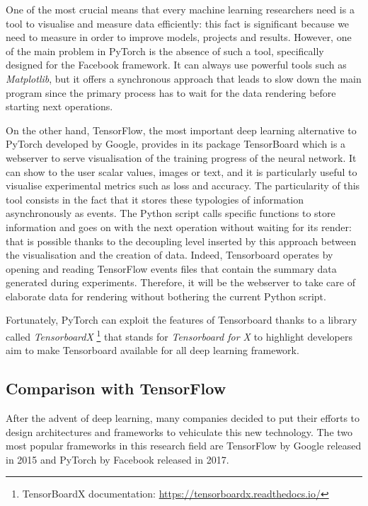 One of the most crucial means that every machine learning researchers need is a tool to visualise and measure data efficiently: this fact is significant because we need to measure in order to improve models, projects and results.
However, one of the main problem in PyTorch is the absence of such a tool, specifically designed for the Facebook framework.
It can always use powerful tools such as \textit{Matplotlib}, but it offers a synchronous approach that leads to slow down the main program since the primary process has to wait for the data rendering before starting next operations.

On the other hand, TensorFlow, the most important deep learning alternative to PyTorch developed by Google, provides in its package TensorBoard which is a webserver to serve visualisation of the training progress of the neural network.
It can show to the user scalar values, images or text, and it is particularly useful to visualise experimental metrics such as loss and accuracy.
The particularity of this tool consists in the fact that it stores these typologies of information asynchronously as events.
The Python script calls specific functions to store information and goes on with the next operation without waiting for its render: that is possible thanks to the decoupling level inserted by this approach between the visualisation and the creation of data.
Indeed, Tensorboard operates by opening and reading  TensorFlow events files that contain the summary data generated during experiments.
Therefore, it will be the webserver to take care of elaborate data for rendering without bothering the current Python script.

Fortunately, PyTorch can exploit the features of Tensorboard thanks to a library called \textit{TensorboardX} \footnote{TensorBoardX documentation: \href{https://tensorboardx.readthedocs.io/en/latest/index.html}{https://tensorboardx.readthedocs.io/}} that stands for \textit{Tensorboard for X} to highlight developers aim to make Tensorboard available for all deep learning framework.

\subsection{Comparison with TensorFlow}

After the advent of deep learning, many companies decided to put their efforts to design architectures and frameworks to vehiculate this new technology.
The two most popular frameworks in this research field are TensorFlow \cite{abadi2016tensorflow} by Google released in 2015 and PyTorch \cite{paszke2017automatic}  by Facebook released in 2017.


